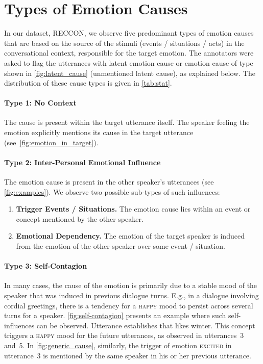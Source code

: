 \documentclass[smallextended]{svjour3}
\newcommand\emo[1]{\textsc{#1}}
\newcommand\RECCONDA{RECCON}
\newcommand\0{\hphantom{0}}
\begin{document}
\section{Types of Emotion Causes}
\label{sec:types}
In our dataset, \RECCONDA{}, we observe five predominant types of emotion causes that are based on the source of the stimuli (events / situations / acts) in the conversational context, responsible for the target emotion. 
The annotators were asked to flag the utterances with latent emotion cause or emotion cause of type 
shown in \cref{fig:latent_cause} (unmentioned latent cause),
as explained below.
The distribution of these cause types is given in \cref{tab:stat}.



\paragraph{Type 1: No Context} The cause is present within the target utterance itself. The speaker feeling the emotion explicitly mentions its cause in the target utterance (see~\cref{fig:emotion_in_target}).
 


\paragraph{Type 2: Inter-Personal Emotional Influence}
The emotion cause is present in the other speaker's utterances (see \cref{fig:examples}).
We observe two possible sub-types of such influences:
\begin{enumerate}[itemsep=0ex, leftmargin=*, label=2\alph*)]
    \item \textbf{Trigger Events / Situations.} The emotion cause lies within an event or concept mentioned by the other speaker.
    \item \textbf{Emotional Dependency.} The emotion of the target speaker is induced from the emotion of the other speaker over some event / situation.
\end{enumerate}

\paragraph{Type 3: Self-Contagion}
In many cases, 
the cause of the emotion is primarily due to a stable mood of the speaker that was induced in 
previous dialogue turns. 
E.g.,
in a dialogue involving cordial greetings, there is a tendency for a \emo{happy} mood to persist across several turns for a speaker. \cref{fig:self-contagion} presents an example where such self-influences can be observed. Utterance  establishes that  likes winter. This concept triggers a \emo{happy} mood for the future utterances, as observed in utterances~3 and~5. In \cref{fig:generic_cause}, similarly, the trigger of emotion \emo{excited} in utterance~3 is mentioned by the same speaker in his or her previous utterance.
\end{document}
